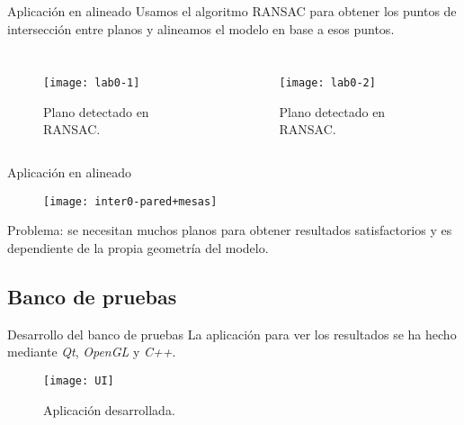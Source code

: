 \documentclass[9pt]{beamer}
\begin{document}
	\begin{frame}{Aplicación en alineado}
		Usamos el algoritmo RANSAC para obtener los puntos de intersección entre planos y alineamos el modelo en base a esos puntos.
		\begin{columns}
			\begin{figure}[h!]
				\texttt{[image: lab0-1]}
				\caption{Plano detectado en RANSAC.}
			\end{figure}
			\begin{figure}[h!]
				\texttt{[image: lab0-2]}
				\caption{Plano detectado en RANSAC.}
			\end{figure} 
		\end{columns}
	\end{frame}
	\begin{frame}{Aplicación en alineado}
	\begin{figure}[h!]
		\texttt{[image: inter0-pared+mesas]}		
	\end{figure} 

	Problema: se necesitan muchos planos para obtener resultados satisfactorios y es dependiente de la propia geometría del modelo.
	
	\end{frame}

	\subsection{Banco de pruebas}
	\begin{frame}{Desarrollo del banco de pruebas}
		La aplicación para ver los resultados se ha hecho mediante \textit{Qt}, \textit{OpenGL} y \textit{C++}.
		\begin{figure}[h!]
			\texttt{[image: UI]}
			\caption{Aplicación desarrollada.}
		\end{figure} 
	\end{frame}

	\section{}
	
	\begin{frame}
		\maketitle
	\end{frame}
\end{document}
